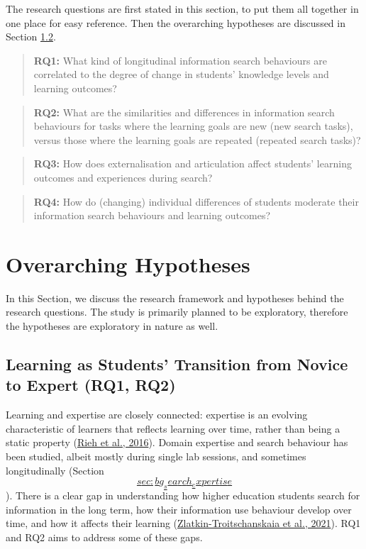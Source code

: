 \documentclass[a4paper, nobind]{templates/ociamthesis}
\begin{document}
The research questions are first stated in this section, to put them all
together in one place for easy reference. Then the overarching
hypotheses are discussed in Section
\protect\hyperlink{sec:rq_hypotheses}{1.2}.

\begin{quote}
\textbf{RQ1:} What kind of longitudinal information search behaviours are
correlated to the degree of change in students' knowledge levels and
learning outcomes?
\end{quote}

\begin{quote}
\textbf{RQ2:} What are the similarities and differences in information
search behaviours for tasks where the learning goals are new (new
search tasks), versus those where the learning goals are repeated
(repeated search tasks)?
\end{quote}

\begin{quote}
\textbf{RQ3:} How does externalisation and articulation affect students'
learning outcomes and experiences during search?
\end{quote}

\begin{quote}
\textbf{RQ4:} How do (changing) individual differences of students moderate
their information search behaviours and learning outcomes?
\end{quote}

\hypertarget{sec:rq_hypotheses}{%
\section{Overarching Hypotheses}\label{sec:rq_hypotheses}}

In this Section, we discuss the research framework and hypotheses behind
the research questions. The study is primarily planned to be
exploratory, therefore the hypotheses are exploratory in nature as well.

\hypertarget{sec:framework_rq1_rq2}{%
\subsection{Learning as Students' Transition from Novice to Expert (RQ1, RQ2)}\label{sec:framework_rq1_rq2}}

Learning and expertise are closely connected: expertise is an evolving
characteristic of learners that reflects learning over time, rather than
being a static property (\protect\hyperlink{ref-rieh2016searching}{Rieh et al., 2016}). Domain expertise and
search behaviour has been studied, albeit mostly during single lab
sessions, and sometimes longitudinally (Section
\protect\hyperlink{sec:bg_search_expertise}{\[sec:bg_search_expertise\]}). There is a clear gap in
understanding how higher education students search for information in
the long term, how their information use behaviour develop over time,
and how it affects their learning (\protect\hyperlink{ref-zlatkin2021students}{Zlatkin-Troitschanskaia et al., 2021}). RQ1 and RQ2
aims to address some of these gaps.
\end{document}
